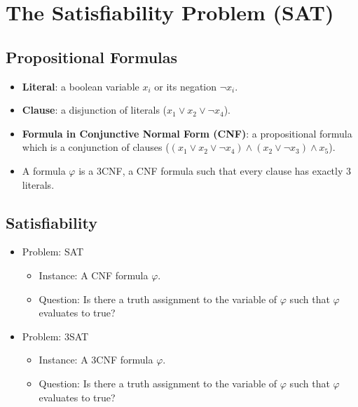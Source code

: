 \documentclass[12pt]{article}
\date{April 22, 2021}
\begin{document}
\maketitle

\section{The Satisfiability Problem (SAT)}

\subsection{Propositional Formulas}
\begin{itemize}
    \item \textbf{Literal}: a boolean variable $x_i$ or its negation $\neg x_i$.
    \item \textbf{Clause}: a disjunction of literals ($x_1 \lor x_2 \lor \neg x_4$).
    \item \textbf{Formula in Conjunctive Normal Form (CNF)}: a propositional formula which is a conjunction of clauses ($(x_1 \lor x_2 \lor \neg x_4) \land (x_2 \lor \neg x_3) \land x_5$).
    \item A formula $\varphi$ is a 3CNF, a CNF formula such that every clause has exactly 3 literals.
\end{itemize}

\subsection{Satisfiability}
\begin{itemize}
    \item Problem: SAT
    \begin{itemize}
        \item Instance: A CNF formula $\varphi$.
        \item Question: Is there a truth assignment to the variable of $\varphi$ such that $\varphi$ evaluates to true?
    \end{itemize}
    \item Problem: 3SAT
    \begin{itemize}
        \item Instance: A 3CNF formula $\varphi$.
        \item Question: Is there a truth assignment to the variable of $\varphi$ such that $\varphi$ evaluates to true?
    \end{itemize}
\end{itemize}
\end{document}
